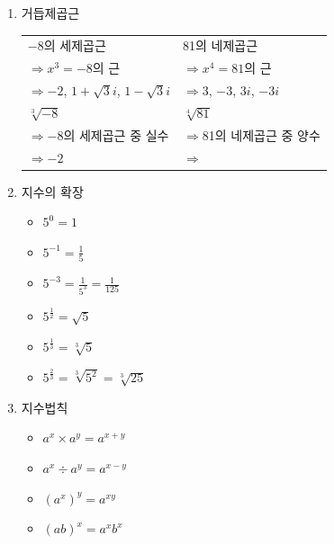 \documentclass{oblivoir}
\begin{document}
\begin{enumerate}[label=\arabic*.,itemsep=40pt]
\item
거듭제곱근\\

\begin{tabu}{|X|X|}	\hline
\(-8\)의 세제곱근							&81의 네제곱근\\
\(\Rightarrow\)\;\;\(x^3=-8\)의 근				&\(\Rightarrow\)\;\;\(x^4=81\)의 근\\
\(\Rightarrow\)\;\;\(-2\), \(1+\sqrt3i\), \(1-\sqrt3i\)	&\(\Rightarrow\)\;\;\(3\), \(-3\), \(3i\), \(-3i\)\\\hline
\(\sqrt[3]{-8}\)								&\(\sqrt[4]{81}\)\\
\(\Rightarrow\)\;\;\(-8\)의 세제곱근 중 실수		&\(\Rightarrow\)\;\;81의 네제곱근 중 양수\\
\(\Rightarrow\)\;\;\(-2\)						&\(\Rightarrow\)\;\\\hline
\end{tabu}
\item
지수의 확장
\begin{itemize}
\item
\(5^0=1\)
\item
\(5^{-1}=\frac15\)
\item
\(5^{-3}=\frac1{5^3}=\frac1{125}\)
\item
\(5^{\frac12}=\sqrt5\)
\item
\(5^{\frac13}=\sqrt[3]5\)
\item
\(5^{\frac23}=\sqrt[3]{5^2}=\sqrt[3]{25}\)
\end{itemize}
\item
지수법칙
\begin{itemize}
\item
\(a^x\times a^y=a^{x+y}\)
\item
\(a^x\div a^y=a^{x-y}\)
\item
\((a^x)^y=a^{xy}\)
\item
\((ab)^x=a^xb^x\)
\end{itemize}
\end{enumerate}
\end{document}
